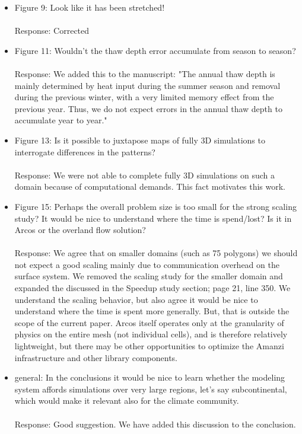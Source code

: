 \documentclass[12pt]{article}\usepackage{amsmath, amssymb, graphicx, array}
\begin{document}
\begin{itemize}
\item Figure 9: Look like it has been stretched! \\ \\
Response: Corrected

\item Figure 11: Wouldn't the thaw depth error accumulate from season to season? \\ \\
Response: We added this to the manuscript: "The annual thaw depth is mainly determined by heat input during the summer season and removal during the previous winter, with a very limited memory effect from the previous year. Thus, we do not expect errors in the annual thaw depth to accumulate year to year." 

\item Figure 13: Is it possible to juxtapose maps of fully 3D simulations to interrogate differences in the patterns? \\ \\
Response: We were not able to complete fully 3D simulations on such a domain because of computational demands.  This fact motivates this work.

\item Figure 15: Perhaps the overall problem size is too small for the strong scaling study? It would be nice to understand where the time is spend/lost? Is it in Arcos or the overland flow solution? \\ \\ 
Response: We agree that on smaller domains (such as 75 polygons) we should not expect a good scaling mainly due to communication overhead on the surface system. We removed the scaling study for the smaller domain and expanded the discussed in the Speedup study section; page 21, line 350. We understand the scaling behavior, but also agree it would be nice to understand where the time is spent more generally.  But, that is outside the scope of the current paper. Arcos itself operates only at the granularity of physics on the entire mesh (not individual cells), and is therefore relatively lightweight, but there may be other opportunities to optimize the Amanzi infrastructure and other library components.

\item general:  In the conclusions it would be nice to learn whether the modeling system affords simulations over very large regions, let's say subcontinental, which would make it relevant also for the climate community. \\ \\
Response: Good suggestion. We have added this discussion to the conclusion. 
\end{itemize}
\end{document}

